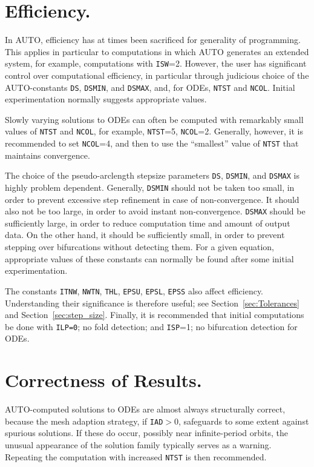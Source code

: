\documentclass[12pt]{report}
\begin{document}
\section{ Efficiency.} \label{sec:Efficiency}
In {\cal AUTO}, efficiency has at times been sacrificed for generality of programming.
This applies in particular to computations in which {\cal AUTO} generates
an extended system, for example, computations with {\tt ISW}=2.
However, the user has significant control over computational efficiency,
in particular through judicious choice of the {\cal AUTO}-constants  
{\tt DS}, {\tt DSMIN}, and {\tt DSMAX}, and, for ODEs, {\tt NTST} and {\tt NCOL}.
Initial experimentation normally suggests appropriate values.

Slowly varying solutions to ODEs can often 
be computed with remarkably small values of {\tt NTST} and {\tt NCOL}, 
for example, {\tt NTST}=5,  {\tt NCOL}=2.
Generally, however, it is recommended to set {\tt NCOL}=4,
and then to use the ``smallest'' value of {\tt NTST} that maintains convergence.

The choice of the pseudo-arclength stepsize parameters
{\tt DS}, {\tt DSMIN}, and {\tt DSMAX}
is highly problem dependent.
Generally, {\tt DSMIN} should not be taken too small,
in order to prevent excessive step refinement in case of non-convergence.
It should also not be too large, in order to avoid instant non-convergence.
{\tt DSMAX} should be sufficiently large, in order to reduce computation time
and amount of output data.
On the other hand, it should be sufficiently small, in order to prevent
stepping over bifurcations without detecting them.
For a given equation, appropriate values of these constants 
can normally be found after some initial experimentation.

The constants {\tt ITNW}, {\tt NWTN}, {\tt THL}, {\tt EPSU}, {\tt EPSL}, {\tt EPSS} 
also affect efficiency.
Understanding their significance is therefore useful; 
see Section~\ref{sec:Tolerances} and Section~\ref{sec:step_size}.
Finally, it is recommended that initial computations be done with 
{\tt ILP=0}; no fold detection;
and {\tt ISP}=1; no bifurcation detection for ODEs.
 
\section{ Correctness of Results.} \label{sec:Correctness}
{\cal AUTO}-computed solutions to ODEs are almost always structurally correct,
because the mesh adaption strategy, if {\tt IAD}$>$0, safeguards to some extent
against spurious solutions.
If these do occur, possibly near infinite-period orbits,
the unusual appearance of the solution family typically serves as a warning.
Repeating the computation with increased {\tt NTST} is then recommended.
\end{document}
